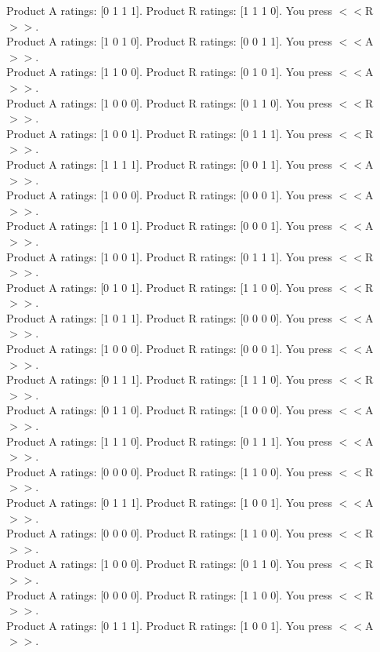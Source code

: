 \documentclass[pdflatex,sn-nature]{sn-jnl}%
\theoremstyle{thmstyleone}%
\theoremstyle{thmstyletwo}%
\theoremstyle{thmstylethree}%
\begin{document}
Product A ratings: [0 1 1 1]. Product R ratings: [1 1 1 0]. You press $<<$R$>>$. $~$\\ 
Product A ratings: [1 0 1 0]. Product R ratings: [0 0 1 1]. You press $<<$A$>>$. $~$\\ 
Product A ratings: [1 1 0 0]. Product R ratings: [0 1 0 1]. You press $<<$A$>>$. $~$\\ 
Product A ratings: [1 0 0 0]. Product R ratings: [0 1 1 0]. You press $<<$R$>>$. $~$\\ 
Product A ratings: [1 0 0 1]. Product R ratings: [0 1 1 1]. You press $<<$R$>>$. $~$\\ 
Product A ratings: [1 1 1 1]. Product R ratings: [0 0 1 1]. You press $<<$A$>>$. $~$\\ 
Product A ratings: [1 0 0 0]. Product R ratings: [0 0 0 1]. You press $<<$A$>>$. $~$\\ 
Product A ratings: [1 1 0 1]. Product R ratings: [0 0 0 1]. You press $<<$A$>>$. $~$\\ 
Product A ratings: [1 0 0 1]. Product R ratings: [0 1 1 1]. You press $<<$R$>>$. $~$\\ 
Product A ratings: [0 1 0 1]. Product R ratings: [1 1 0 0]. You press $<<$R$>>$. $~$\\ 
Product A ratings: [1 0 1 1]. Product R ratings: [0 0 0 0]. You press $<<$A$>>$. $~$\\ 
Product A ratings: [1 0 0 0]. Product R ratings: [0 0 0 1]. You press $<<$A$>>$. $~$\\ 
Product A ratings: [0 1 1 1]. Product R ratings: [1 1 1 0]. You press $<<$R$>>$. $~$\\ 
Product A ratings: [0 1 1 0]. Product R ratings: [1 0 0 0]. You press $<<$A$>>$. $~$\\ 
Product A ratings: [1 1 1 0]. Product R ratings: [0 1 1 1]. You press $<<$A$>>$. $~$\\ 
Product A ratings: [0 0 0 0]. Product R ratings: [1 1 0 0]. You press $<<$R$>>$. $~$\\ 
Product A ratings: [0 1 1 1]. Product R ratings: [1 0 0 1]. You press $<<$A$>>$. $~$\\ 
Product A ratings: [0 0 0 0]. Product R ratings: [1 1 0 0]. You press $<<$R$>>$. $~$\\ 
Product A ratings: [1 0 0 0]. Product R ratings: [0 1 1 0]. You press $<<$R$>>$. $~$\\ 
Product A ratings: [0 0 0 0]. Product R ratings: [1 1 0 0]. You press $<<$R$>>$. $~$\\ 
Product A ratings: [0 1 1 1]. Product R ratings: [1 0 0 1]. You press $<<$A$>>$. $~$\\ 
\end{document}
